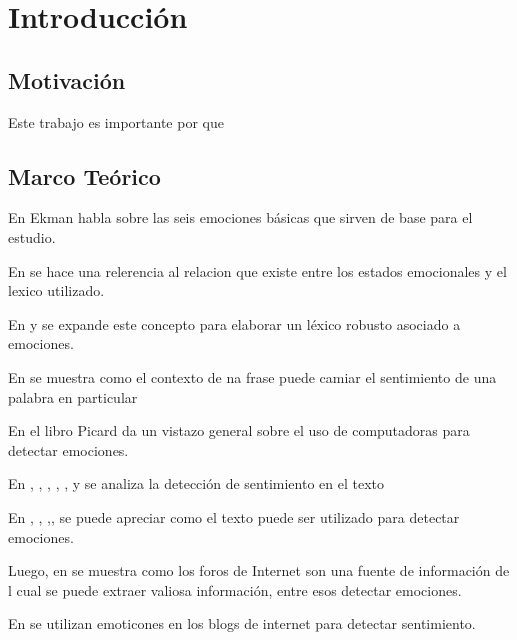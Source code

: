 \chapter{Introducción}






\section{Motivación}

Este trabajo es importante por que 



\section{Marco Teórico}

En \cite{ekman1993facial} Ekman habla sobre las seis emociones básicas que sirven de base para el estudio.

En \cite{ortony1987referential} se hace una relerencia al relacion que existe entre los estados emocionales y el lexico utilizado.

En \cite{strapparava2004wordnet} y \cite{esuli2006sentiwordnet} se expande este concepto para elaborar un léxico robusto asociado a emociones.

En \cite{wilson2009recognizing} se muestra como el contexto de na frase puede camiar el sentimiento de una palabra en particular

En el libro \cite{picard2000affective} Picard da un vistazo general sobre el uso de computadoras para detectar emociones.

En \cite{pang2002thumbs}, \cite{pang2004sentimental}, \cite{dave2003mining}, \cite{wilson2005recognizing}, \cite{turney2002thumbs}, \cite{nasukawa2003sentiment} y  se analiza la detección de sentimiento en el texto

En \cite{wiebe2005annotating}\cite{strapparava2008learning}, \cite{strapparava2007semeval}, \cite{alm2005emotions},\cite{aman2007identifying}, \cite{liu2003model}  se puede apreciar como el texto puede ser utilizado para detectar emociones.

Luego, en \cite{pang2008opinion} se muestra como los foros de Internet son una fuente de información de l cual se puede extraer valiosa información, entre esos detectar emociones.

En \cite{read2005using} se utilizan emoticones en los blogs de internet para detectar sentimiento.


